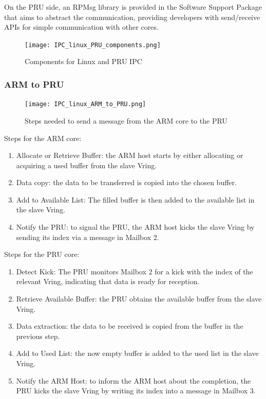 On the PRU side, an RPMsg library is provided in the Software Support Package
that aims to abstract the communication, providing developers with send/receive
APIs for simple communication with other cores.

\begin{figure}[ht]
    \centering
    \texttt{[image: IPC\_linux\_PRU\_components.png]}
    \caption{Components for Linux and PRU IPC}
\end{figure}

\subsubsection{ARM to PRU}

\begin{figure}[ht]
    \centering
    \texttt{[image: IPC\_linux\_ARM\_to\_PRU.png]}
    \caption{Steps needed to send a message from the ARM core to the PRU}
\end{figure}

Steps for the ARM core:

\begin{enumerate}
    \item   Allocate or Retrieve Buffer: the ARM host starts by either
            allocating or acquiring a used buffer from the slave Vring.
    \item   Data copy: the data to be transferred is copied into the chosen
            buffer.
    \item   Add to Available List: The filled buffer is then added to the
            available list in the slave Vring.
    \item   Notify the PRU: to signal the PRU, the ARM host kicks the slave
            Vring by sending its index via a message in Mailbox 2.
\end{enumerate}

Steps for the PRU core:

\begin{enumerate}
    \item   Detect Kick: The PRU monitors Mailbox 2 for a kick with the index
            of the relevant Vring, indicating that data is ready for reception.
    \item   Retrieve Available Buffer: the PRU obtains the available buffer
            from the slave Vring.
    \item   Data extraction: the data to be received is copied from the buffer
            in the previous step.
    \item   Add to Used List: the now empty buffer is added to the used list
            in the slave Vring.
    \item   Notify the ARM Host: to inform the ARM host about the completion,
            the PRU kicks the slave Vring by writing its index into a message
            in Mailbox 3.
\end{enumerate}

